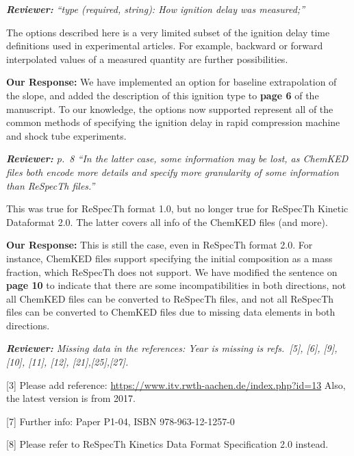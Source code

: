 \documentclass[a4paper,10pt]{elsarticle}
\newenvironment{reviewer}{\vspace{0.5\baselineskip}\begingroup\itshape\textbf{Reviewer:}}{\endgroup}
\newenvironment{response}{\textbf{Our Response:}}{\vspace{0.5\baselineskip}}
\begin{document}
\begin{reviewer}
    ``type (required, string): How ignition delay was measured;''

    The options described here is a very limited subset of the ignition delay time definitions used
    in experimental articles. For example, backward or forward interpolated values of a measured
    quantity are further possibilities.
\end{reviewer}

\begin{response}
    We have implemented an option for baseline extrapolation of the slope, and added the
    description of this ignition type to \textbf{page 6} of the manuscript. To our knowledge,
    the options now supported represent all of the common methods of specifying the ignition delay
    in rapid compression machine and shock tube experiments.
\end{response}

\begin{reviewer}
    p.~8 ``In the latter case, some information may be lost, as ChemKED files both encode more
    details and specify more granularity of some information than ReSpecTh files.''

    This was true for ReSpecTh format 1.0, but no longer true for ReSpecTh Kinetic Dataformat 2.0.
    The latter covers all info of the ChemKED files (and more).
\end{reviewer}

\begin{response}
    This is still the case, even in ReSpecTh format 2.0. For instance, ChemKED files support
    specifying the initial composition as a mass fraction, which ReSpecTh does not support. We have
    modified the sentence on \textbf{page 10} to indicate that there are some incompatibilities
    in both directions, not all ChemKED files can be converted to ReSpecTh files, and
    not all ReSpecTh files can be converted to ChemKED files due to missing data elements in both directions.
\end{response}

\begin{reviewer}
    Missing data in the references: Year is missing is refs.~[5], [6], [9], [10], [11], [12],
    [21],[25],[27].

    [3] Please add reference: \url{https://www.itv.rwth-aachen.de/index.php?id=13}  Also, the
    latest version is from 2017.

    [7] Further info:  Paper P1-04, ISBN 978-963-12-1257-0

    [8] Please refer to ReSpecTh Kinetics Data Format Specification 2.0 instead.
\end{reviewer}
\end{document}
